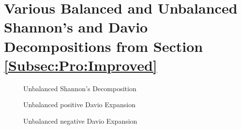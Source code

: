 \section{Various Balanced and Unbalanced Shannon's and Davio Decompositions from Section \ref{Subsec:Pro:Improved}}
\label{App:ManyDecomp}
\begin{figure}[h]
  \begin{minipage}{0.45\linewidth}
    \begin{center}
      \scalebox{0.5} {
        
      }
    \end{center}
    \caption{Balanced Shannon's Decomposition}
    \label{app-shannon}
  \end{minipage}
  \hspace{0.5cm}
  \begin{minipage}{0.45\linewidth}
    \begin{center}
      \scalebox{0.5} {
        
      }
    \end{center}
    \caption{Unbalanced Shannon's Decomposition}
    \label{app-shannon-unb}
  \end{minipage}
\end{figure}
\begin{figure}[h]
  \begin{minipage}{0.45\linewidth}
    \begin{center}
      \scalebox{0.5} {
        
      }
    \end{center}
    \caption{Balanced positive Davio Expansion}
    \label{app-davio-pos}
  \end{minipage}
  \hspace{0.5cm}
  \begin{minipage}{0.45\linewidth}
    \begin{center}
      \scalebox{0.5} {
        
      }
    \end{center}
    \caption{Unbalanced positive Davio Expansion}
    \label{app-davio-pos-unb}
  \end{minipage}
\end{figure}
\begin{figure}[h]
  \begin{minipage}{0.45\linewidth}
    \begin{center}
      \scalebox{0.5} {
        
      }
    \end{center}
    \caption{Balanced negative Davio Expansion}
    \label{app-davio-neg}
  \end{minipage}
  \hspace{0.5cm}
  \begin{minipage}{0.45\linewidth}
    \begin{center}
      \scalebox{0.5} {
        
      }
    \end{center}
    \caption{Unbalanced negative Davio Expansion}
    \label{app-davio-neg-unb}
  \end{minipage}
\end{figure}


